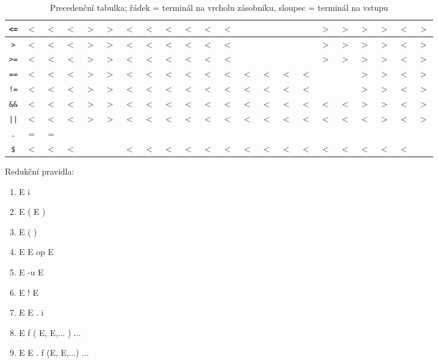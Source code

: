 \begin{table}[H]
\begin{tabular}{|c||c|c|c|c|c|c|c|c|c|c|c|c|c|c|c|c|c|c|c|c|c|}
\texttt{<=} & $<$ & $<$ & $<$ & $>$ & $>$ & $<$ & $<$ & $<$ & $<$ & $<$ & $<$ &  &  &  &  & $>$ & $>$ & $>$ & $>$ & $<$ & $>$ \\ \hline
\texttt{>} & $<$ & $<$ & $<$ & $>$ & $>$ & $<$ & $<$ & $<$ & $<$ & $<$ & $<$ &  &  &  &  & $>$ & $>$ & $>$ & $>$ & $<$ & $>$ \\ \hline
\texttt{>=} & $<$ & $<$ & $<$ & $>$ & $>$ & $<$ & $<$ & $<$ & $<$ & $<$ & $<$ &  &  &  &  & $>$ & $>$ & $>$ & $>$ & $<$ & $>$ \\ \hline
\texttt{==} & $<$ & $<$ & $<$ & $>$ & $>$ & $<$ & $<$ & $<$ & $<$ & $<$ & $<$ & $<$ & $<$ & $<$ & $<$ &  &  & $>$ & $>$ & $<$ & $>$ \\ \hline
\texttt{!=} & $<$ & $<$ & $<$ & $>$ & $>$ & $<$ & $<$ & $<$ & $<$ & $<$ & $<$ & $<$ & $<$ & $<$ & $<$ &  &  & $>$ & $>$ & $<$ & $>$ \\ \hline
\texttt{\&\&} & $<$ & $<$ & $<$ & $>$ & $>$ & $<$ & $<$ & $<$ & $<$ & $<$ & $<$ & $<$ & $<$ & $<$ & $<$ & $<$ & $<$ & $>$ & $>$ & $<$ & $>$ \\ \hline
\texttt{||} & $<$ & $<$ & $<$ & $>$ & $>$ & $<$ & $<$ & $<$ & $<$ & $<$ & $<$ & $<$ & $<$ & $<$ & $<$ & $<$ & $<$ & $<$ & $>$ & $<$ & $>$ \\ \hline
\texttt{.} & $=$ & $=$ &  &  &  &  &  &  &  &  &  &  &  &  &  &  &  &  &  &  &  \\ \hline
\texttt{\$} & $<$ & $<$ & $<$ &  &  & $<$ & $<$ & $<$ & $<$ & $<$ & $<$ & $<$ & $<$ & $<$ & $<$ & $<$ & $<$ & $<$ & $<$ & $<$ &  \\ \hline
\end{tabular}
\caption{Precedenční tabulka; řádek = terminál na vrcholu zásobníku, sloupec = terminál na vstupu}
\end{table}

Redukční pravidla:
\begin{enumerate}[nosep, leftmargin=*, labelsep=0.4em, label=\arabic*.]
  \item E \arr{} i 
  \item E \arr{} ( E )
  \item E \arr{} ( ) 
  \item E \arr{} E op E 
  \item E \arr{} -u E 
  \item E \arr{} ! E 
  \item E \arr{} E . i 
  \item E \arr{} f ( E, E,... ) ... 
  \item E \arr{} E . f (E, E,...) ... 
\end{enumerate}

